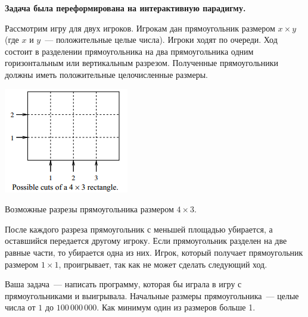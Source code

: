 {\bf Задача была переформирована на интерактивную парадигму. }

Рассмотрим игру для двух игроков. Игрокам дан прямоугольник размером $x \times y$ (где $x$ и $y$~--- положительные целые числа). 
Игроки ходят по очереди. Ход состоит в разделении прямоугольника на два прямоугольника одним горизонтальным или вертикальным разрезом. 
Полученные прямоугольники должны иметь положительные целочисленные размеры.

\includegraphics{rectangle.png}

Возможные разрезы прямоугольника размером $4 \times 3$.

После каждого разреза прямоугольник с меньшей площадью убирается, а оставшийся передается другому игроку. 
Если прямоугольник разделен на две равные части, то убирается одна из них.
Игрок, который получает прямоугольник размером $1 \times 1$, проигрывает, так как не может сделать следующий ход.

Ваша задача~--- написать программу, которая бы играла в игру с прямоугольниками и выигрывала. 
Начальные размеры прямоугольника~--- целые числа от $1$ до $100\,000\,000$. 
Как минимум один из размеров больше 1. 
